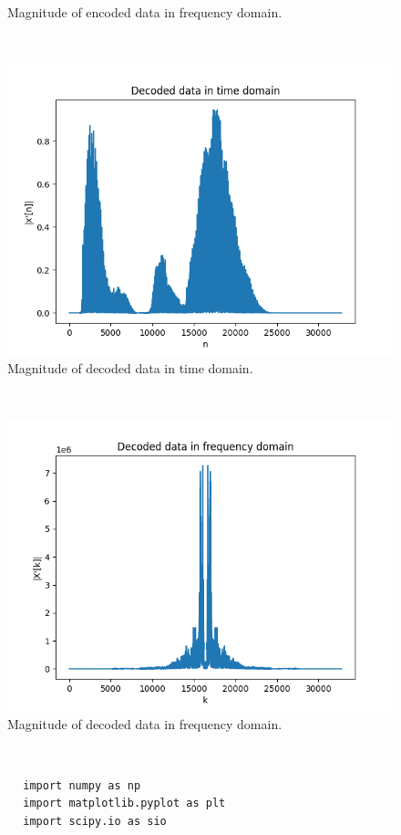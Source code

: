 \documentclass[10pt,a4paper, margin=1in]{article}
\begin{document}
\begin{enumerate}
\begin{figure}[H]
            \caption{Magnitude of encoded data in frequency domain.}
          \end{figure}~\\
          \begin{figure}[H]
            \includegraphics[scale = 0.75]{d_t}
            \caption{Magnitude of decoded data in time domain.}
          \end{figure}~\\
          \begin{figure}[H]
            \includegraphics[scale = 0.75]{d_f}
            \caption{Magnitude of decoded data in frequency domain.}
          \end{figure}~\\
          \lstset{language=Python}
    \lstset{frame=single}
    \lstset{basicstyle=\footnotesize}
    \begin{lstlisting}
        import numpy as np
        import matplotlib.pyplot as plt
        import scipy.io as sio
        

\end{lstlisting}
\end{enumerate}
\end{document}
